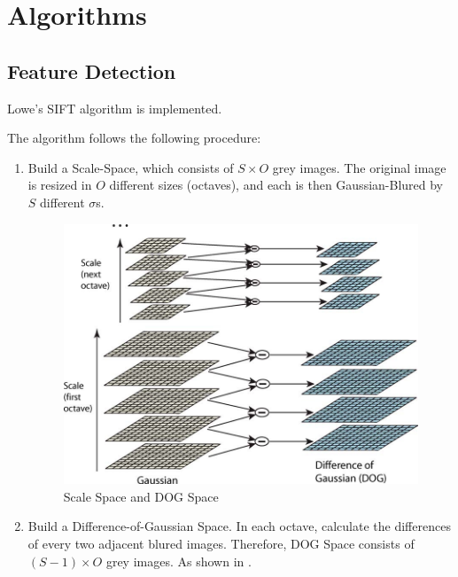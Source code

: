 
\section{Algorithms}
\subsection{Feature Detection}
Lowe's SIFT algorithm\cite{sift} is implemented.

The algorithm follows the following procedure:
\begin{enumerate}
  \item Build a Scale-Space, which consists of $ S \times O$ grey images.
    The original image is resized in $ O$ different sizes (octaves), and each is then Gaussian-Blured
    by $ S$ different $ \sigma$s.
    \begin{figure}[H]
      \centering
      \includegraphics[scale=0.35]{res/dog.png}
      \caption{Scale Space and DOG Space \label{fig:dog}}
    \end{figure}

  \item Build a Difference-of-Gaussian Space.
    In each octave, calculate the differences of every two adjacent blured images.
    Therefore, DOG Space consists of $ (S - 1) \times O$ grey images.
    As shown in .


\end{enumerate}
